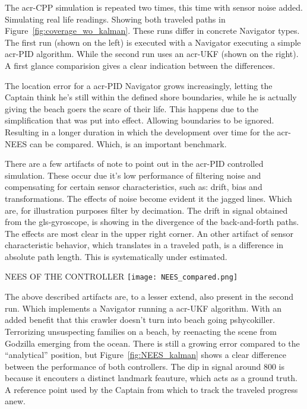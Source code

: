 The \gls{acr-CPP} simulation is repeated two times, this time with sensor noise added. Simulating real life readings.
Showing both traveled paths in Figure~\ref{fig:coverage_wo_kalman}. These runs differ in concrete Navigator types. The
first run (shown on the left) is executed with a Navigator executing a simple \gls{acr-PID} algorithm. While the
second run uses an \gls{acr-UKF} (shown on the right). A first glance comparision gives a clear indication between the
differences.

The location error for a \gls{acr-PID} Navigator grows increasingly, letting the Captain think he's still within
the defined shore boundaries, while he is actually giving the beach goers the scare of their life. This happens due
to the simplification that was put into effect. Allowing boundaries to be ignored. Resulting in a longer duration in
which the development over time for the \gls{acr-NEES} can be compared. Which, is an important benchmark.

There are a few artifacts of note to point out in the \gls{acr-PID} controlled simulation. These occur due it's
low performance of filtering noise and compensating for certain sensor characteristics, such as: drift, bias and
transformations. The effects of noise become evident it the jagged lines. Which are, for illustration purposes
filter by decimation. The drift in signal obtained from the \gls{gls-gyroscope}, is showing in the divergence
of the back-and-forth paths. The effects are most clear in the upper right corner. An other artifact of sensor
characteristic behavior, which translates in a traveled path, is a difference in absolute path length. This is
systematically under estimated.

\begin{RoyalFigure}[htb, label=fig:NEES_kalman]{NEES OF THE CONTROLLER}
    \texttt{[image: NEES\_compared.png]}
\end{RoyalFigure}

The above described artifacts are, to a lesser extend, also present in the second run. Which implements a
Navigator running a \gls{acr-UKF} algorithm. With an added benefit that this crawler doesn't turn into beach going
pshycokiller. Terrorizing unsuspecting families on a beach, by reenacting the scene from Godzilla emerging from the
ocean. There is still a growing error compared to the ``analytical'' position, but Figure~\ref{fig:NEES_kalman}
shows a clear difference between the performance of both controllers. The dip in signal around \( 800 \) is because
it encouters a distinct landmark feauture, which acts as a ground truth. A reference point used by the Captain from
which to track the traveled progress anew.